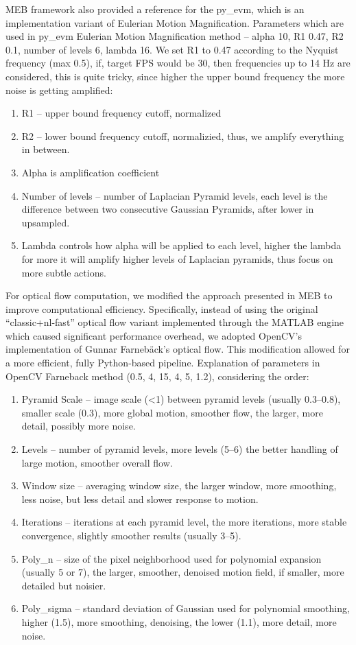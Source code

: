 \documentclass{article}
\begin{document}
MEB framework also provided a reference for the py\_evm, which is an implementation variant of Eulerian Motion Magnification. Parameters which are used in py\_evm Eulerian Motion Magnification method – alpha 10, R1 0.47, R2 0.1, number of levels 6, lambda 16. We set R1 to 0.47 according to the Nyquist frequency (max 0.5), if, target FPS would be 30, then frequencies up to 14 Hz are considered, this is quite tricky, since higher the upper bound frequency the more noise is getting amplified:

\begin{enumerate}
    \item R1 – upper bound frequency cutoff, normalized
    \item R2 – lower bound frequency cutoff, normalizied, thus, we amplify everything in between.
    \item Alpha is amplification coefficient
    \item Number of levels – number of Laplacian Pyramid levels, each level is the difference between two consecutive Gaussian Pyramids, after lower in upsampled.
    \item Lambda controls how alpha will be applied to each level, higher the lambda for more it will amplify higher levels of Laplacian pyramids, thus focus on more subtle actions.
\end{enumerate}

For optical flow computation, we modified the approach presented in MEB to improve computational efficiency. Specifically, instead of using the original “classic+nl-fast” optical flow variant implemented through the MATLAB engine which caused significant performance overhead, we adopted OpenCV’s implementation of Gunnar Farnebäck’s optical flow. This modification allowed for a more efficient, fully Python-based pipeline. Explanation of parameters in OpenCV Farneback method (0.5, 4, 15, 4, 5, 1.2), considering the order:

\begin{enumerate}
    \item Pyramid Scale – image scale (<1) between pyramid levels (usually 0.3–0.8), smaller scale (0.3), more global motion, smoother flow, the larger, more detail, possibly more noise.
    \item Levels – number of pyramid levels, more levels (5–6) the better handling of large motion, smoother overall flow.
    \item Window size – averaging window size, the larger window, more smoothing, less noise, but less detail and slower response to motion.
    \item Iterations – iterations at each pyramid level, the more iterations, more stable convergence, slightly smoother results (usually 3–5).
    \item Poly\_n – size of the pixel neighborhood used for polynomial expansion (usually 5 or 7), the larger, smoother, denoised motion field, if smaller, more detailed but noisier.
    \item Poly\_sigma – standard deviation of Gaussian used for polynomial smoothing, higher (1.5), more smoothing, denoising, the lower (1.1), more detail, more noise.
\end{enumerate}
\end{document}
